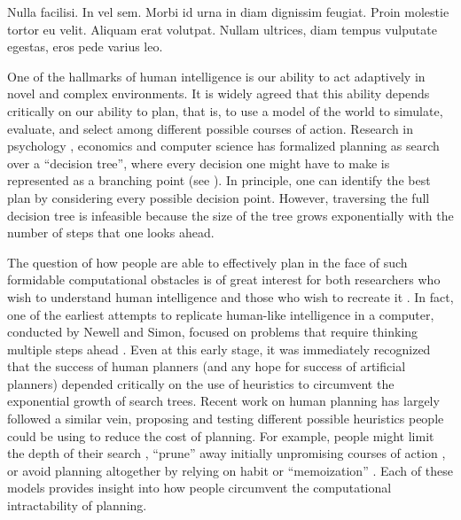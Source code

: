 \begin{savequote}[75mm]
Nulla facilisi. In vel sem. Morbi id urna in diam dignissim feugiat. Proin molestie tortor eu velit. Aliquam erat volutpat. Nullam ultrices, diam tempus vulputate egestas, eros pede varius leo.
\end{savequote}

\label{sec:planning}


One of the hallmarks of human intelligence is our ability to act adaptively in novel and complex environments. It is widely agreed that this ability depends critically on our ability to plan, that is, to use a model of the world to simulate, evaluate, and select among different possible courses of action. Research in psychology \citep{huys2015interplay,huys2012bonsai,vanopheusden2017computational,macgregor2001information,keramati2016adaptive,krusche2018adaptive,snider2015prospective}, economics \citep{vonneumann1944theory,stahl1994experimental,camerer2004cognitive} and computer science \citep{newell1956logic} has formalized planning as search over a ``decision tree'', where every decision one might have to make is represented as a branching point (see ). In principle, one can identify the best plan by considering every possible decision point. However, traversing the full decision tree is infeasible because the size of the tree grows exponentially with the number of steps that one looks ahead.

The question of how people are able to effectively plan in the face of such formidable computational obstacles is of great interest for both researchers who wish to understand human intelligence and those who wish to recreate it \citep{griffiths2019doing}. In fact, one of the earliest attempts to replicate human-like intelligence in a computer, conducted by Newell and Simon, focused on problems that require thinking multiple steps ahead \citep{newell1956logic,newell1959report,newell1972human}. Even at this early stage, it was immediately recognized that the success of human planners (and any hope for success of artificial planners) depended critically on the use of heuristics to circumvent the exponential growth of search trees. Recent work on human planning has largely followed a similar vein, proposing and testing different possible heuristics people could be using to reduce the cost of planning. For example, people might limit the depth of their search \citep{macgregor2001information,keramati2016adaptive,krusche2018adaptive,snider2015prospective}, ``prune'' away initially unpromising courses of action \citep{huys2012bonsai,huys2015interplay}, or avoid planning altogether by relying on habit or ``memoization'' \citep{huys2015interplay,kool2017costbenefit}. Each of these models provides insight into how people circumvent the computational intractability of planning. 

